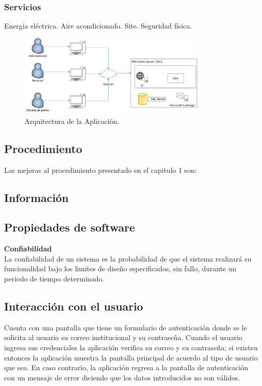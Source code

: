\subsubsection{Servicios}
Energía eléctrica.
Aire acondicionado.
Site.
Seguridad física. 

	\begin{figure}[htbp!]
		\centering
			\includegraphics[width=0.8\textwidth]{images/propuesta/arquitectura}
		\caption{Arquitectura de la Aplicación.}
	\end{figure}
	
\subsection{Procedimiento}
Las mejoras al procedimiento presentado en el capitulo 1 son:


\subsection{Información}

\subsection{Propiedades de software}

\textbf{Confiabilidad\\}
La confiabilidad de un sistema es la probabilidad de que el sistema realizará su funcionalidad bajo los limites de diseño especificados, sin fallo, durante un periodo de tiempo determinado. \\

\subsection{Interacción con el usuario}
Cuenta con una pantalla que tiene un formulario de autenticación donde se le solicita al usuario su correo institucional y su contraseña. Cuando el usuario ingresa sus credenciales la aplicación verifica su correo y su contraseña; si existen entonces la aplicación muestra la pantalla principal de acuerdo al tipo de usuario que sea. En caso contrario, la aplicación regresa a la pantalla de autenticación con un mensaje de error diciendo que los datos introducidos no son válidos.

